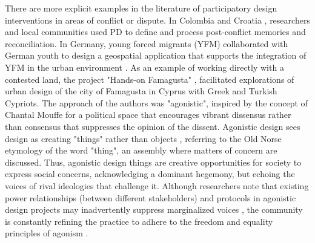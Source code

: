 \documentclass[dissertation,math,vertlayout,pdfa,colorlinks]{aaltoseries}
\begin{document}
There are more explicit examples in the literature of participatory design interventions in areas of conflict or dispute. In Colombia \cite{patarroyoTestimonialDigitalTextiles2019} and Croatia \cite{jolicBottomupVsTopdown2023}, researchers and local communities used PD to define and process post-conflict memories and reconciliation. In Germany, young forced migrants (YFM) collaborated with German youth to design a geospatial application that supports the integration of YFM in the urban environment \cite{duarteParticipatoryDesignParticipatory2018}. As an example of working directly with a contested land, the project "Hands-on Famagusta" \cite{stratisReclaimingPoliticalUrbanism2017}, facilitated explorations of urban design of the city of Famagusta in Cyprus with Greek and Turkish Cypriots. The approach of the authors was "agonistic", inspired by the concept of Chantal Mouffe \cite{mouffeAgonisticsThinkingWorld2013} for a political space that encourages vibrant dissensus rather than consensus that suppresses the opinion of the dissent. Agonistic design \cite{bjorgvinssonAgonisticParticipatoryDesign2012, disalvoAdversarialDesign2015} sees design as creating "things" rather than objects \cite{binderDesignThings2011}, referring to the Old Norse etymology of the word "thing", an assembly where matters of concern are discussed. Thus, agonistic design things are creative opportunities for society to express social concerns, acknowledging a dominant hegemony, but echoing the voices of rival ideologies that challenge it. Although researchers note that existing power relationships (between different stakeholders) and protocols in agonistic design projects may inadvertently suppress marginalized voices \cite{buschBetrayalPostpoliticalParticipation2023, markussenDisruptiveAestheticsDesign2013}, the community is constantly refining the practice to adhere to the freedom and equality principles of agonism \cite{geppertDesignEquivalenceAgonism2022}.
\end{document}
